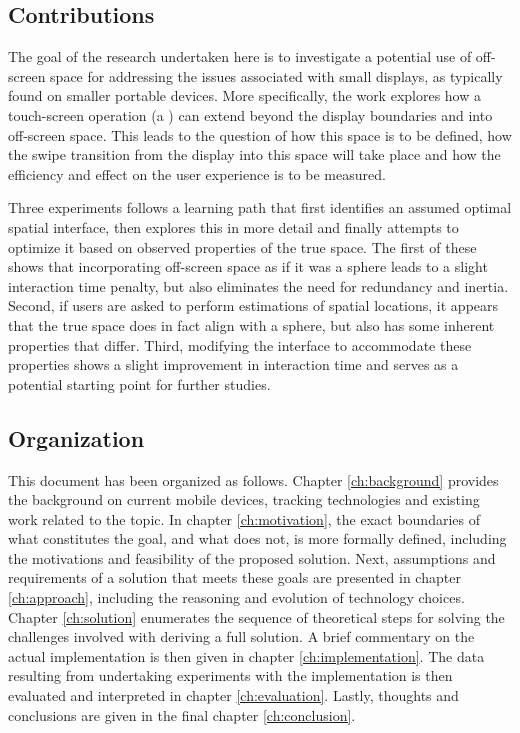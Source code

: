 \subsection{Contributions}

The goal of the research undertaken here is to investigate a potential use of off-screen space for addressing the issues associated with small displays, as typically found on  smaller portable devices.  More specifically, the work explores  how a touch-screen operation (a ) can extend beyond the display boundaries and into off-screen space. This leads to the question of how this space is to be defined, how the swipe transition from the display into this space will take place and how the efficiency and effect on the user experience is to be measured. 

Three experiments follows a learning path that first identifies an assumed optimal spatial interface, then explores this in more detail and finally attempts to optimize it based on observed properties of the true space. The first of these shows that incorporating off-screen space as if it was a sphere leads to a slight interaction time penalty, but also eliminates the need for redundancy and inertia. Second, if users are asked to perform estimations of spatial locations, it appears that the true space does in fact align with a sphere, but also has some inherent properties that differ. Third, modifying the interface to accommodate these properties shows a slight improvement in interaction time and serves as a potential starting point for further studies. 

  
\subsection{Organization}

This document has been organized as follows. Chapter \ref{ch:background} provides the background on current mobile devices, tracking technologies and existing work  related to the topic. In chapter \ref{ch:motivation}, the exact boundaries of what constitutes the goal, and what does not, is more formally defined, including the motivations and feasibility of the proposed solution. Next, assumptions and requirements of a solution that meets these goals are presented in chapter \ref{ch:approach}, including the reasoning and evolution of technology choices. Chapter \ref{ch:solution} enumerates the sequence of theoretical steps for solving the challenges involved with deriving a full solution. A brief commentary on the actual implementation is then given in chapter \ref{ch:implementation}. The data resulting from undertaking experiments with the implementation is then evaluated and interpreted in chapter \ref{ch:evaluation}. Lastly, thoughts and conclusions are given in the final chapter \ref{ch:conclusion}.


